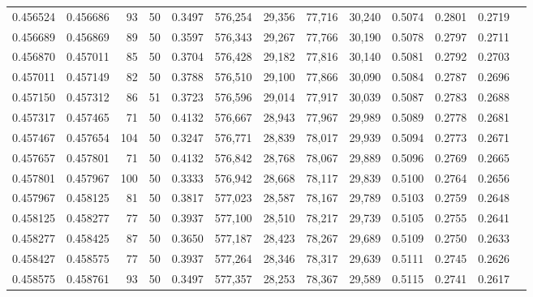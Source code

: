 \begin{tabular}{rrrrrrrrrrrrr}
0.456524 & 0.456686 &    93 &  50 &                                     0.3497 & 576,254 &  29,356 &  77,716 &  30,240 & 0.5074 & 0.2801 & 0.2719 \\
0.456689 & 0.456869 &    89 &  50 &                                     0.3597 & 576,343 &  29,267 &  77,766 &  30,190 & 0.5078 & 0.2797 & 0.2711 \\
0.456870 & 0.457011 &    85 &  50 &                                     0.3704 & 576,428 &  29,182 &  77,816 &  30,140 & 0.5081 & 0.2792 & 0.2703 \\
0.457011 & 0.457149 &    82 &  50 &                                     0.3788 & 576,510 &  29,100 &  77,866 &  30,090 & 0.5084 & 0.2787 & 0.2696 \\
0.457150 & 0.457312 &    86 &  51 &                                     0.3723 & 576,596 &  29,014 &  77,917 &  30,039 & 0.5087 & 0.2783 & 0.2688 \\
0.457317 & 0.457465 &    71 &  50 &                                     0.4132 & 576,667 &  28,943 &  77,967 &  29,989 & 0.5089 & 0.2778 & 0.2681 \\
0.457467 & 0.457654 &   104 &  50 &                                     0.3247 & 576,771 &  28,839 &  78,017 &  29,939 & 0.5094 & 0.2773 & 0.2671 \\
0.457657 & 0.457801 &    71 &  50 &                                     0.4132 & 576,842 &  28,768 &  78,067 &  29,889 & 0.5096 & 0.2769 & 0.2665 \\
0.457801 & 0.457967 &   100 &  50 &                                     0.3333 & 576,942 &  28,668 &  78,117 &  29,839 & 0.5100 & 0.2764 & 0.2656 \\
0.457967 & 0.458125 &    81 &  50 &                                     0.3817 & 577,023 &  28,587 &  78,167 &  29,789 & 0.5103 & 0.2759 & 0.2648 \\
0.458125 & 0.458277 &    77 &  50 &                                     0.3937 & 577,100 &  28,510 &  78,217 &  29,739 & 0.5105 & 0.2755 & 0.2641 \\
0.458277 & 0.458425 &    87 &  50 &                                     0.3650 & 577,187 &  28,423 &  78,267 &  29,689 & 0.5109 & 0.2750 & 0.2633 \\
0.458427 & 0.458575 &    77 &  50 &                                     0.3937 & 577,264 &  28,346 &  78,317 &  29,639 & 0.5111 & 0.2745 & 0.2626 \\
0.458575 & 0.458761 &    93 &  50 &                                     0.3497 & 577,357 &  28,253 &  78,367 &  29,589 & 0.5115 & 0.2741 & 0.2617 \\

\end{tabular}
